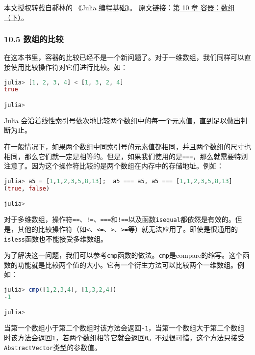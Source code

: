 
本文授权转载自郝林的 《Julia 编程基础》。 原文链接：\href{https://github.com/hyper0x/JuliaBasics/blob/master/book/ch10.md}{第 10 章 容器：数组（下）}。


\subsubsection{10.5 数组的比较}

在这本书里，容器的比较已经不是一个新问题了。对于一维数组，我们同样可以直接使用比较操作符对它们进行比较。如：

\begin{lstlisting}[language=julia]
julia> [1, 2, 3, 4] < [1, 3, 2, 4]
true

julia> 
\end{lstlisting}

Julia 会沿着线性索引号依次地比较两个数组中的每一个元素值，直到足以做出判断为止。

在一般情况下，如果两个数组中同索引号的元素值都相同，并且两个数组的尺寸也相同，那么它们就一定是相等的。但是，如果我们使用的是\verb|===|，那么就需要特别注意了。因为这个操作符比较的是两个数组在内存中的存储地址。例如：

\begin{lstlisting}[language=julia]
julia> a5 = [1,1,2,3,5,8,13];  a5 === a5, a5 === [1,1,2,3,5,8,13]
(true, false)

julia> 
\end{lstlisting}

对于多维数组，操作符\verb|==|、\verb|!=|、\verb|===|和\verb|!==|以及函数\verb|isequal|都依然是有效的。但是，其他的比较操作符（如\verb|<|、\verb|<=|、\verb|>|、\verb|>=|等）就无法应用了。即使是很通用的\verb|isless|函数也不能接受多维数组。

为了解决这一问题，我们可以参考\verb|cmp|函数的做法。\verb|cmp|是compare的缩写。这个函数的功能就是比较两个值的大小。它有一个衍生方法可以比较两个一维数组。例如：

\begin{lstlisting}[language=julia]
julia> cmp([1,2,3,4], [1,3,2,4])
-1

julia> 
\end{lstlisting}

当第一个数组小于第二个数组时该方法会返回\verb|-1|，当第一个数组大于第二个数组时该方法会返回\verb|1|，若两个数组相等它就会返回\verb|0|。不过很可惜，这个方法只接受\verb|AbstractVector|类型的参数值。

